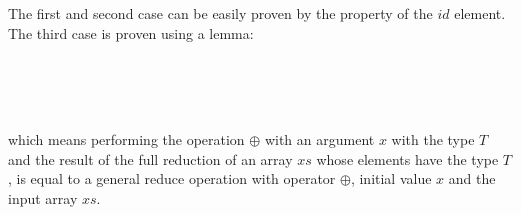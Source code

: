 \documentclass{l4proj}
\begin{document}
The first and second case can be easily proven by the property of the $id$ element. The third case is proven using a lemma:
\begin{code}%
\>[0]\AgdaSpace{}%
\AgdaSymbol{:}%
\>[1334I]\AgdaSymbol{\{}\AgdaSpace{}%
\AgdaSymbol{:}\AgdaSpace{}%
\AgdaSymbol{\}}\AgdaSpace{}%
\AgdaSpace{}%
\AgdaSymbol{\{}\AgdaSpace{}%
\AgdaSymbol{:}\AgdaSpace{}%
\AgdaSymbol{\}}\AgdaSpace{}%
\<%
\\
\>[.][@{}l@{}]\<[1334I]%
\>[19]\AgdaSymbol{(}\AgdaSpace{}%
\AgdaSymbol{:}\AgdaSpace{}%
\AgdaSpace{}%
\AgdaSymbol{)}\AgdaSpace{}%
\AgdaSpace{}%
\AgdaSymbol{(}\AgdaSpace{}%
\AgdaSymbol{:}\AgdaSpace{}%
\AgdaSymbol{)}\AgdaSpace{}%
\AgdaSpace{}%
\AgdaSymbol{(}\AgdaSpace{}%
\AgdaSymbol{:}\AgdaSpace{}%
\AgdaSpace{}%
\AgdaSpace{}%
\AgdaSymbol{)}\AgdaSpace{}%
\<%
\\
%
\>[19]\AgdaSpace{}%
\AgdaSpace{}%
\AgdaSymbol{=}\AgdaSpace{}%
\AgdaSpace{}%
\AgdaSpace{}%
\<%
\\
%
\>[19]\AgdaSpace{}%
\AgdaSpace{}%
\AgdaSpace{}%
\AgdaSpace{}%
\AgdaSpace{}%
\AgdaSpace{}%
\AgdaSpace{}%
\AgdaSpace{}%
\AgdaSpace{}%
\<%
\end{code}
which means performing the operation $\oplus$ with an argument $x$ with the type $T$ and the result of the full reduction of an array $xs$ whose elements have the type $T$, is equal to a general reduce operation with operator $\oplus$, initial value $x$ and the input array $xs$.
\end{document}
